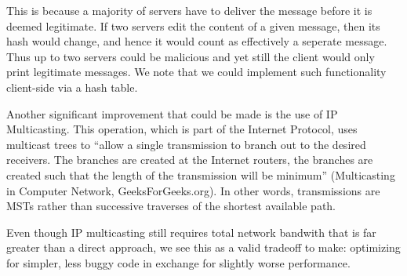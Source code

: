 \documentclass[
	a4paper, %
	10pt, %
	unnumberedsections, %
	twoside, %
]{LTJournalArticle}
\begin{document}
\smallskip
This is because a majority of servers have to deliver the message before it is deemed legitimate. If two servers edit the content of a given message, then its hash would change, and hence it would count as effectively a seperate message. Thus up to two servers could be malicious and yet still the client would only print legitimate messages. We note that we could implement such functionality client-side via a hash table.

\smallskip
Another significant improvement that could be made is the use of IP Multicasting. This operation, which is part of the Internet Protocol, uses multicast trees to ``allow a single transmission to branch out to the desired receivers. The branches are created at the Internet routers, the branches are created such that the length of the transmission will be minimum'' (Multicasting in Computer Network, GeeksForGeeks.org). In other words, transmissions are MSTs rather than successive traverses of the shortest available path.

\smallskip
Even though IP multicasting still requires total network bandwith that is far greater than a direct approach, we see this as a valid tradeoff to make: optimizing for simpler, less buggy code in exchange for slightly worse performance.
\end{document}
